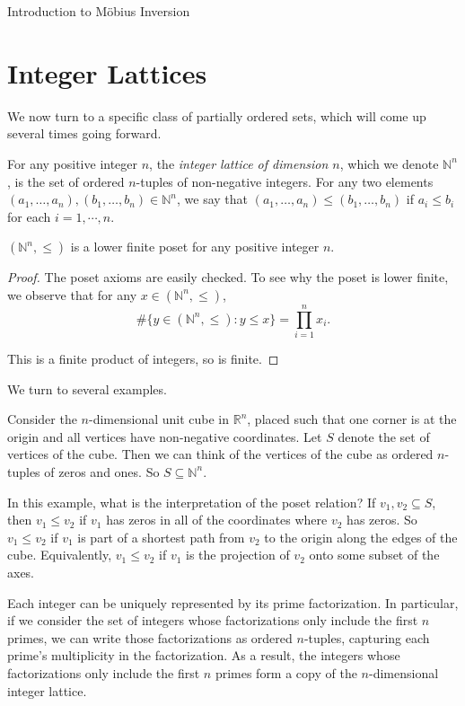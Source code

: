 \documentclass[12pt]{pom_thesis}
\newcommand{\Nn}{\mathbb{N}}
\newcommand{\Rr}{\mathbb{R}}
\begin{document}
\begin{chapter}{Introduction to M\"obius Inversion}
\section{Integer Lattices}
We now turn to a specific class of partially ordered sets, which will come up several times going forward.
\begin{defn}\label{lattice}
For any positive integer $n$, the \emph{integer lattice of dimension $n$}, which we denote $\Nn^n$, is the set of ordered $n$-tuples of non-negative integers. For any two elements $(a_1,\dots,a_n), (b_1,\dots,b_n) \in \Nn^n$, we say that $(a_1,\dots,a_n)\leq (b_1,\dots,b_n)$ if $a_i \leq b_i$ for each $i = 1,\cdots,n$.
\end{defn}
\begin{lemma}
$(\Nn^n, \leq)$ is a lower finite poset for any positive integer $n$. 
\end{lemma}
\begin{proof}
The poset axioms are easily checked. To see why the poset is lower finite, we observe that for any $x \in (\Nn^n, \leq)$,
\[
\#\{y \in (\Nn^n, \leq):y \leq x\} = \prod_{i =1}^n x_i.
\]

This is a finite product of integers, so is finite.
\end{proof}

We turn to several examples.
\begin{examp}
Consider the $n$-dimensional unit cube in $\Rr^n$, placed such that one corner is at the origin and all vertices have non-negative coordinates. Let $S$ denote the set of vertices of the cube. Then we can think of the vertices of the cube as ordered $n$-tuples of zeros and ones. So $S \subseteq \Nn^{n}$. 

In this example, what is the interpretation of the poset relation? If $v_1, v_2 \subseteq S$, then $v_1 \leq v_2$ if $v_1$ has zeros in all of the coordinates where $v_2$ has zeros. So $v_1 \leq v_2$ if $v_1$ is part of a shortest path from $v_2$ to the origin along the edges of the cube. Equivalently, $v_1 \leq v_2$ if $v_1$ is the projection of $v_2$ onto some subset of the axes. 
\end{examp}
\begin{examp}
Each integer can be uniquely represented by its prime factorization. In particular, if we consider the set of integers whose factorizations only include the first $n$ primes, we can write those factorizations as ordered $n$-tuples, capturing each prime's multiplicity in the factorization. As a result, the integers whose factorizations only include the first $n$ primes form a copy of the $n$-dimensional integer lattice. 


\end{examp}
\end{chapter}
\end{document}
